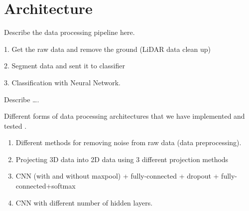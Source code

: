 \section{Architecture}\label{sec:Architecture}


Describe the data processing pipeline here. 


1. Get the raw data and remove the ground (LiDAR data clean up)

2. Segment data and sent it to classifier 

3. Classification with Neural Network. 



Describe \ldots. 

Different forms of data processing architectures that we have implemented and tested . 

\begin{enumerate}
  \item Different methods for removing noise from raw data (data preprocessing). 
  \item Projecting 3D data into 2D data using 3 different projection methods 
  \item CNN  (with and without maxpool) + fully-connected + dropout + fully-connected+softmax
  \item CNN with different number of hidden layers. 

\end{enumerate}